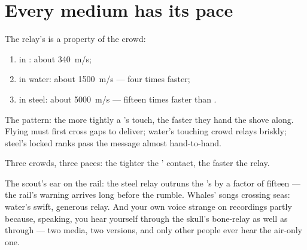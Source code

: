 \section{Every medium has its pace}

\begin{proposition}\label{prop:g7:sound-production:speeds}
The relay's  is a property of the crowd:
\begin{enumerate}
  \item in : about \qty{340}{m/s};
  \item in water: about \qty{1500}{m/s} --- four times faster;
  \item in steel: about \qty{5000}{m/s} --- fifteen times
        faster than .
\end{enumerate}
The pattern: the more tightly a 's  touch, the
faster they hand the shove along. Flying   must
first cross gaps to deliver; water's touching crowd relays
briskly; steel's locked ranks pass the message almost
hand-to-hand.
\end{proposition}

\begin{omfigure}

{\small Three crowds, three paces: the tighter the '
contact, the faster the relay.}
\end{omfigure}

\begin{example}\label{ex:g7:sound-production:scenes}
The scout's ear on the rail: the steel relay outruns the 's
by a factor of fifteen --- the rail's warning arrives long
before the rumble. Whales' songs crossing seas: water's swift,
generous relay. And your own voice  strange on recordings
partly because, speaking, you hear yourself through the skull's
bone-relay as well as through  --- two media, two versions,
and only other people ever hear the air-only one.
\end{example}

